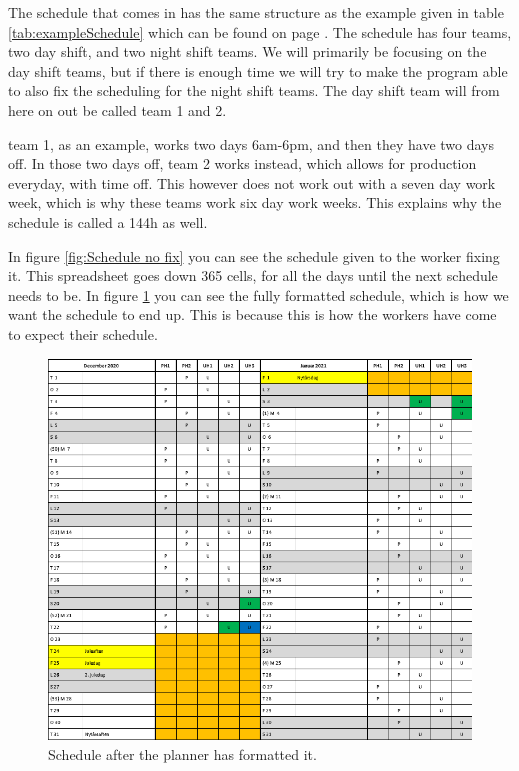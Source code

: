 The schedule that comes in has the same structure as the example given in table \ref{tab:exampleSchedule} which can be found on page \pageref{tab:exampleSchedule}. The schedule has four teams, two day shift, and two night shift teams. We will primarily be focusing on the day shift teams, but if there is enough time we will try to make the program able to also fix the scheduling for the night shift teams. The day shift team will from here on out be called \primo team 1 and 2.


\primo team 1, as an example, works two days 6am-6pm, and then they have two days off. In those two days off, \primo team 2 works instead, which allows for production everyday, with time off. This however does not work out with a seven day work week, which is why these teams work six day work weeks. This explains why the schedule is called a 144h as well.


In figure \ref{fig:Schedule no fix} you can see the schedule given to the worker fixing it. This spreadsheet goes down 365 cells, for all the days until the next schedule needs to be. In figure \ref{fig:Schedule formated} you can see the fully formatted schedule, which is how we want the schedule to end up. This is because this is how the workers have come to expect their schedule.

\begin{figure}[ht!]
    \centering
    \includegraphics[width=\textwidth]{media/Schedule formated.png}
    \caption{Schedule after the planner has formatted it.}
    \label{fig:Schedule formated}
\end{figure}



